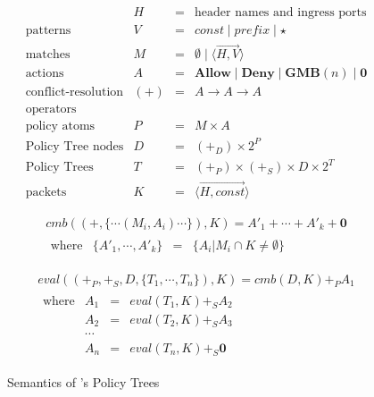 \begin{figure}

\begin{displaymath}
\begin{array}{lrcl}
& H & = & \textrm{header names and ingress ports} \\
\textrm{patterns} & V & = & \textit{const} \mid \textit{prefix} \mid \star \\
\textrm{matches} & M & = & 
  \emptyset \mid \langle \overrightarrow{H,V} \rangle \\
\textrm{actions} & A & = & \textbf{Allow} \mid \textbf{Deny} 
  \mid \textbf{GMB}(n) \mid \textbf{0} \\
\textrm{conflict-resolution} & (+)  & = & A \rightarrow A \rightarrow A \\
\textrm{operators} \\
\textrm{policy atoms} & P & = & M \times A \\
\textrm{Policy Tree nodes} & D & = & (+_D) \times 2^P \\
\textrm{Policy Trees} & T & = & (+_P) \times (+_S) \times D \times 2^{T} \\
\textrm{packets} & K & = & \langle \overrightarrow{H,\mathit{const}} \rangle
\end{array}
\end{displaymath}

\begin{displaymath}
\begin{array}{l}
\mathit{cmb}((+,\{ \cdots (M_i,A_i) \cdots \}), K) = 
  A'_1 + \cdots + A'_k + \textbf{0} \\
\begin{array}{lrcl}
\textrm{where} & \{ A'_1, \cdots, A'_k \} & = & \{ A_i | M_i \cap K \ne \emptyset \}
\end{array}
\end{array}
\end{displaymath}

\begin{displaymath}
\begin{array}{l}
\textit{eval}((+_P,+_S,D,\{ T_1,\cdots, T_n \}), K) = \textit{cmb}(D, K) +_P A_1 \\
\begin{array}{lrcl}
\textrm{where}
& A_1 & = & eval(T_1,K) +_S A_2 \\
& A_2 & = & eval(T_2,K) +_S A_3 \\
& \cdots \\
& A_n & = & eval(T_n,K) +_S \textbf{0}
\end{array}
\end{array}
\end{displaymath}

\caption[Caption for Semantics]{Semantics of \sys's Policy Trees \footnotemark }
\label{f:sharesem}
\end{figure}


